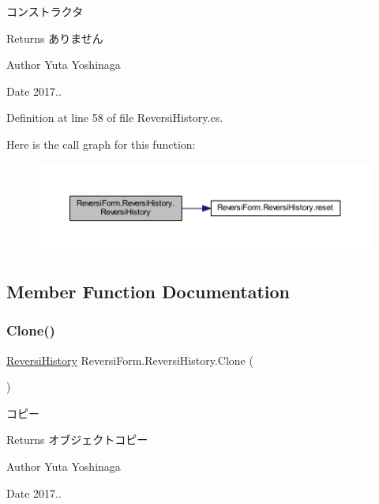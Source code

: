 コンストラクタ 

\begin{DoxyReturn}{Returns}
ありません 
\end{DoxyReturn}
\begin{DoxyAuthor}{Author}
Yuta Yoshinaga 
\end{DoxyAuthor}
\begin{DoxyDate}{Date}
2017.. 
\end{DoxyDate}


Definition at line 58 of file Reversi\+History.\+cs.

Here is the call graph for this function\+:
\nopagebreak
\begin{figure}[H]
\begin{center}
\leavevmode
\includegraphics[width=350pt]{class_reversi_form_1_1_reversi_history_aef9c390a68d81077b70bc6181587106b_cgraph}
\end{center}
\end{figure}


\subsection{Member Function Documentation}
\mbox{\label{class_reversi_form_1_1_reversi_history_abfbbd1ca8654256ba743c3f07b573484}} 
\subsubsection{\texorpdfstring{Clone()}{Clone()}}
{\footnotesize\ttfamily \hyperlink{class_reversi_form_1_1_reversi_history}{Reversi\+History} Reversi\+Form.\+Reversi\+History.\+Clone (\begin{DoxyParamCaption}{ }\end{DoxyParamCaption})}



コピー 

\begin{DoxyReturn}{Returns}
オブジェクトコピー 
\end{DoxyReturn}
\begin{DoxyAuthor}{Author}
Yuta Yoshinaga 
\end{DoxyAuthor}
\begin{DoxyDate}{Date}
2017.. 
\end{DoxyDate}


